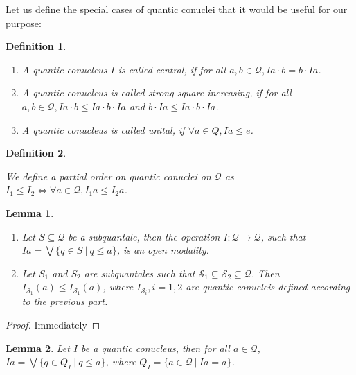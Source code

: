 \documentclass[a4paper]{article}
\theoremstyle{defin}
\newtheorem{defin}{Definition}
\theoremstyle{theorem}
\theoremstyle{prop}
\theoremstyle{lemma}
\newtheorem{lemma}{Lemma}
\theoremstyle{ex}
\theoremstyle{col}
\begin{document}
Let us define the special cases of quantic conuclei that it would be useful for our purpose:

\begin{defin}
$ $
\begin{enumerate}
  \item A quantic conucleus $I$ is called central, if for all
  $a, b \in \mathcal{Q}, I a \cdot b = b \cdot I a$.

  \item A quantic conucleus is called strong square-increasing,
  if for all $a, b \in \mathcal{Q}, I a \cdot b \leq I a \cdot b \cdot I a$ and
  $b \cdot I a \leq I a \cdot b \cdot I a$.

  \item A quantic conucleus is called unital, if $\forall a \in Q, I a \leq e$.
\end{enumerate}
\end{defin}

\begin{defin}
$ $

  We define a partial order on quantic conuclei on $\mathcal{Q}$ as
  $I_1 \leq I_2 \Leftrightarrow \forall a \in \mathcal{Q}, I_1 a \leq I_2 a$.
\end{defin}

\begin{lemma}
$ $

  \begin{enumerate}
    \item Let $S \subseteq \mathcal{Q}$ be a subquantale, then the operation $I : \mathcal{Q} \to \mathcal{Q}$, such that $I a = \bigvee \{ q \in S \: | \: q \leq a \}$, is an open modality.
    \item Let $S_1$ and $S_2$ are subquantales such that $\mathcal{S}_1 \subseteq \mathcal{S}_2 \subseteq \mathcal{Q}$. Then $I_{\mathcal{S}_1} (a) \leq I_{\mathcal{S}_1} (a)$, where $I_{\mathcal{S}_i}, i = 1,2$ are quantic conucleis defined according to the previous part.
  \end{enumerate}
\end{lemma}

\begin{proof}
  Immediately
\end{proof}

\begin{lemma} Let $I$ be a quantic conucleus, then for all $a \in \mathcal{Q}$, $I a = \bigvee \{ q \in Q_{I} \: | \: q \leq a \}$, where $Q_{I} = \{ a \in \mathcal{Q} \: | \: I a = a \}$.
\end{lemma}
\end{document}
